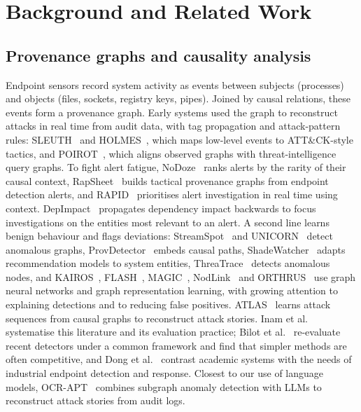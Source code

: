 \section{Background and Related Work}
\label{sec:background}

\subsection{Provenance graphs and causality analysis}
Endpoint sensors record system activity as events between subjects (processes) and objects (files, sockets,
registry keys, pipes). Joined by causal relations, these events form a provenance graph. Early systems used
the graph to reconstruct attacks in real time from audit data, with tag propagation and attack-pattern rules:
SLEUTH~\cite{hossain2017sleuth} and HOLMES~\cite{milajerdi2019holmes}, which maps low-level events to
ATT\&CK-style tactics, and POIROT~\cite{milajerdi2019poirot}, which aligns observed graphs with threat-intelligence
query graphs. To fight alert fatigue, NoDoze~\cite{hassan2019nodoze} ranks alerts by the rarity of their
causal context, RapSheet~\cite{hassan2020rapsheet} builds tactical provenance graphs from endpoint
detection alerts, and RAPID~\cite{liu2022rapid} prioritises alert investigation in real time using context.
DepImpact~\cite{fang2022depimpact} propagates dependency impact backwards to focus investigations on the
entities most relevant to an alert. A second line learns benign behaviour and flags deviations: StreamSpot~\cite{manzoor2016streamspot}
and UNICORN~\cite{han2020unicorn} detect anomalous graphs, ProvDetector~\cite{wang2020provdetector} embeds
causal paths, ShadeWatcher~\cite{zeng2022shadewatcher} adapts recommendation models to system entities,
ThreaTrace~\cite{wang2022threatrace} detects anomalous nodes, and KAIROS~\cite{cheng2024kairos},
FLASH~\cite{rehman2024flash}, MAGIC~\cite{jia2024magic}, NodLink~\cite{li2024nodlink} and
ORTHRUS~\cite{jiang2025orthrus} use graph neural networks and graph representation learning, with growing
attention to explaining detections and to reducing false positives. ATLAS~\cite{alsaheel2021atlas} learns
attack sequences from causal graphs to reconstruct attack stories. Inam et al.~\cite{inam2023sok} systematise
this literature and its evaluation practice; Bilot et al.~\cite{bilot2025simpler} re-evaluate recent
detectors under a common framework and find that simpler methods are often competitive, and Dong et
al.~\cite{dong2023arewethereyet} contrast academic systems with the needs of industrial endpoint detection
and response. Closest to our use of language models, OCR-APT~\cite{aly2025ocrapt} combines subgraph anomaly
detection with LLMs to reconstruct attack stories from audit logs.

